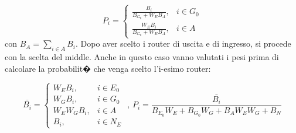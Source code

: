 \begin{equation}
P_i=
\begin{cases}
\frac{B_i}{B_{G_{0}}+W_E B_A},      	& i \in G_0 \\
\frac{W_E B_i}{B_{G_{0}}+W_E B_A}, 	& i \in A
\end{cases}
\end{equation}
con $B_{A}=\sum_{i\in A}B_{i}$.
Dopo aver scelto i router di uscita e di ingresso, si procede con la scelta del middle. Anche in questo caso vanno valutati i pesi prima di calcolare la probabilit� che venga scelto l'i-esimo router:

\begin{equation}
\bar{B_{i}} =
\begin{cases}
W_E B_i,      	& i \in E_0 \\
W_G B_i, 	& i \in G_0 \\
W_E W_G B_i, 	& i \in A \\
B_i,	& i \in N_E 
\end{cases}
 \text{ , } 
P_i=\frac{\bar{B_{i}}}{B_{E_{0}}W_{E}+B_{G_{0}}W_{G}+B_{A}W_{E}W_{G}+B_{N}}
\end{equation}
